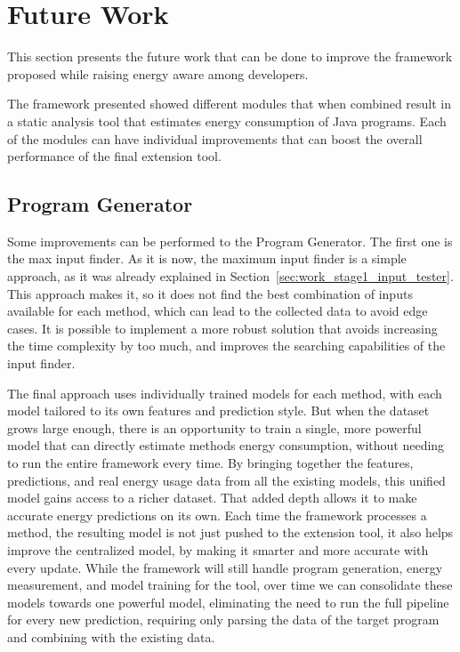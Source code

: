 \chapter{Future Work}\label{chapter:future_work}

This section presents the future work that can be done to improve the framework proposed while raising energy aware among developers.

The framework presented showed different modules that when combined result in a static analysis tool that estimates energy consumption of Java programs. Each of the modules can have individual improvements that can boost the overall performance of the final extension tool.


\section{Program Generator} \label{sec:future_work_program_generator}

Some improvements can be performed to the Program Generator. The first one is the max input finder. As it is now, the maximum input finder is a simple approach, as it was already explained in Section~\ref{sec:work_stage1_input_tester}. This approach makes it, so it does not find the best combination of inputs available for each method, which can lead to the collected data to avoid edge cases. It is possible to implement a more robust solution that avoids increasing the time complexity by too much, and improves the searching capabilities of the input finder.



The final approach uses individually trained models for each method, with each model tailored to its own features and prediction style. But when the dataset grows large enough, there is an opportunity to train a single, more powerful model that can directly estimate methods energy consumption, without needing to run the entire framework every time.
By bringing together the features, predictions, and real energy usage data from all the existing models, this unified model gains access to a richer dataset. That added depth allows it to make accurate energy predictions on its own. Each time the framework processes a method, the resulting model is not just pushed to the extension tool, it also helps improve the centralized model, by making it smarter and more accurate with every update.
While the framework will still handle program generation, energy measurement, and model training for the tool, over time we can consolidate these models towards one powerful model, eliminating the need to run the full pipeline for every new prediction, requiring only parsing the data of the target program and combining with the existing data.


